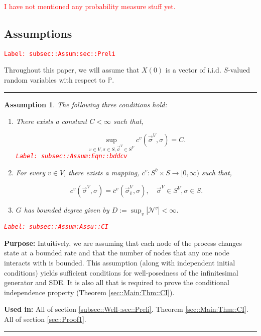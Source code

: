 \documentclass[12pt]{article}
\newcommand{\mb}{\mathbb}
\newcommand{\mc}{\mathcal}
\newcommand{\ra}{\rightarrow}
\newcommand{\ov}{\overline}
\newcommand{\tr}{\textcolor{red}}
\newcommand{\labe}[1]{\tr{\texttt{Label: #1}}}
\newcommand{\purpose}{\textbf{Purpose: }}
\newcommand{\usein}{\textbf{Used in: }}
\newcommand{\lin}{\rule{\linewidth}{0.4 pt}}
\newcommand{\pr}{\mb{P}}							%
\newcommand{\defeq}{:=}								%
\renewcommand{\v}{v}							%
\renewcommand{\S}{S}							%
\newcommand{\s}{\sigma}							%
\newcommand{\sv}{\vec{\s}}						%
\newcommand{\X}{X}								%
\newcommand{\IGr}{c}							%
\newcommand{\neigh}{\mc{N}}						%
\newcommand{\vind}[1]{^{#1}}					%
\newcommand{\carp}[1]{^{#1}}					%
\newcommand{\vsi}[1]{^{#1}}						%
\newcommand{\cind}[1]{_{#1}}					%
\newcommand{\cl}{\ov}							%
\newcommand{\tp}[1]{(#1)}						%
\newcommand{\const}{C}							%
\newcommand{\degr}{D}							%
\newcommand{\IGrg}{\ov{c}}						%
\newtheorem{assu}[thms]{Assumption}
\begin{document}
\tr{I have not mentioned any probability measure stuff yet.}

\subsection{Assumptions}
\label{subsec::Assum:sec::Preli}\labe{subsec::Assum:sec::Preli}

Throughout this paper, we will assume that \(\X\tp{0}\) is a vector of i.i.d. \(\S\)-valued random variables with respect to \(\pr\).

\lin

\begin{assu}
The following three conditions hold:
\begin{enumerate}
\item There exists a constant \(\const < \infty\) such that,

\begin{equation}
\sup_{\v\in V,\s \in \S,\sv\vsi{V}\in \S\carp{V}} \IGr\vind{\v}(\sv\vsi{V},\s) = \const.
\label{subsec::Assum:Eqn::bddcv}
\end{equation}
\labe{subsec::Assum:Eqn::bddcv}

\item For every \(\v\in V\), there exists a mapping, \(\IGrg\vind{\v}:\S\carp{\cl{\v}} \times \S \ra [0,\infty)\) such that,

\[\IGr\vind{\v}(\sv\vsi{V},\s) = \IGrg\vind{\v}(\sv\cind{\cl{\v}}\vsi{V},\s), \quad \sv\vsi{V} \in \S\carp{V},\s\in \S.\]

\item \(G\) has bounded degree given by \(\degr \defeq \sup_\v |\neigh\vind{\v}| < \infty\).
\end{enumerate}
\label{subsec::Assum:Assu::CI}\labe{subsec::Assum:Assu::CI}
\end{assu}

\purpose Intuitively, we are assuming that each node of the process changes state at a bounded rate and that the number of nodes that any one node interacts with is bounded. This assumption (along with independent initial conditions) yields sufficient conditions for well-posedness of the infinitesimal generator and SDE. It is also all that is required to prove the conditional independence property (Theorem \ref{sec::Main:Thm::CI}). 

\usein All of section \ref{subsec::Well-:sec::Preli}. Theorem \ref{sec::Main:Thm::CI}. All of section \ref{sec::Proof1}.

\lin
\end{document}
